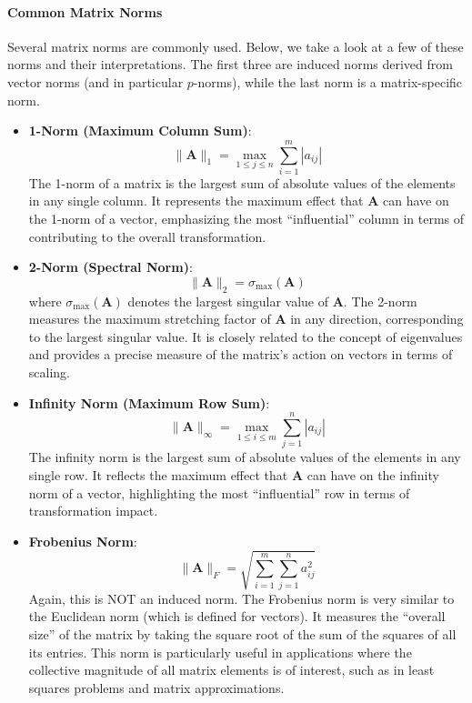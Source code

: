 \paragraph{Common Matrix Norms}
Several matrix norms are commonly used. Below, we take a look at a few of these norms and their interpretations. The first three are induced norms derived from vector norms (and in particular $p$-norms), while the last norm is a matrix-specific norm.
\begin{itemize}
    \item \textbf{1-Norm (Maximum Column Sum)}:
    \begin{equation*}
        \|\mathbf{A}\|_1 = \max_{1 \leq j \leq n} \sum_{i=1}^m |a_{ij}|
    \end{equation*}
    The 1-norm of a matrix is the largest sum of absolute values of the elements in any single column. It represents the maximum effect that $ \mathbf{A} $ can have on the 1-norm of a vector, emphasizing the most  ``influential'' column in terms of contributing to the overall transformation.

    \item \textbf{2-Norm (Spectral Norm)}:
    \begin{equation*}
        \|\mathbf{A}\|_2 = \sigma_{\max}(\mathbf{A})
    \end{equation*}
    where $ \sigma_{\max}(\mathbf{A}) $ denotes the largest singular value of $ \mathbf{A} $. The 2-norm measures the maximum stretching factor of $ \mathbf{A} $ in any direction, corresponding to the largest singular value. It is closely related to the concept of eigenvalues and provides a precise measure of the matrix's action on vectors in terms of scaling.
    
    \item \textbf{Infinity Norm (Maximum Row Sum)}:
    \begin{equation*}
        \|\mathbf{A}\|_\infty = \max_{1 \leq i \leq m} \sum_{j=1}^n |a_{ij}|
    \end{equation*}
    The infinity norm is the largest sum of absolute values of the elements in any single row. It reflects the maximum effect that $ \mathbf{A} $ can have on the infinity norm of a vector, highlighting the most        ``influential'' row in terms of transformation impact.
    
    \item \textbf{Frobenius Norm}:
    \begin{equation*}
        \|\mathbf{A}\|_F = \sqrt{\sum_{i=1}^m \sum_{j=1}^n a_{ij}^2}
    \end{equation*}
    Again, this is NOT an induced norm. The Frobenius norm is very similar to the Euclidean norm (which is defined for vectors). It measures the ``overall size'' of the matrix by taking the square root of the sum of the squares of all its entries. This norm is particularly useful in applications where the collective magnitude of all matrix elements is of interest, such as in least squares problems and matrix approximations.
\end{itemize}


